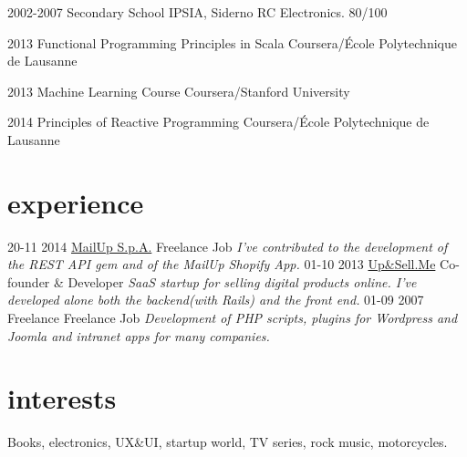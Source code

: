 \documentclass[print]{cv}
\begin{document}
         \begin{entrylist}
	         \entry
         {2002-2007}
         {Secondary School}
         {IPSIA, Siderno RC}
         {Electronics. 80/100}

         \entry
         {2013}
         {Functional Programming Principles in Scala}
         {Coursera/École Polytechnique de Lausanne}
         {}

     \entry
         {2013}
         {Machine Learning Course}
         {Coursera/Stanford University}
         {}

     \entry
         {2014}
         {Principles of Reactive Programming}
         {Coursera/École Polytechnique de Lausanne}
         {}

         \end{entrylist}

         \section{experience}

         \begin{entrylist}
        \entry
         {20-11 2014}
         {\href{http://mailup.com}{MailUp S.p.A.}}
         {Freelance Job}
         {\emph{I've contributed to the development of the REST API gem and of the MailUp Shopify App.}}
         \entry
         {01-10 2013}
         {\href{http://www.upandsell.me}{Up\&Sell.Me}}
         {Co-founder \& Developer}
         {\emph{SaaS startup for selling digital products online. I've developed alone both the backend(with Rails) and the front end.}}
         \entry
         {01-09 2007}
         {Freelance}
         {Freelance Job}
         {\emph{Development of PHP scripts, plugins for Wordpress and Joomla and intranet apps for many companies.}}
         \end{entrylist}

         \section{interests}

         Books, electronics, UX\&UI, startup world, TV series, rock music, motorcycles.

         
\end{document}
